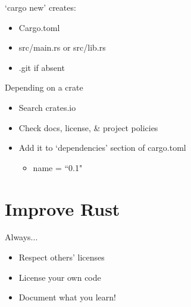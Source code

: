\documentclass[50pt]{beamer}
\begin{document}
\begin{frame}
    `cargo new' creates:
    \begin{itemize}
        \item Cargo.toml
        \item src/main.rs or src/lib.rs
        \item .git if absent
    \end{itemize}
\end{frame}

\begin{frame}[fragile]
    Depending on a crate
    \begin{itemize}
        \item Search crates.io
        \item Check docs, license, \& project policies
        \item Add it to `dependencies' section of cargo.toml
        \begin{itemize}

\item name = ``0.1"

        \end{itemize}
    \end{itemize}
\end{frame}


\section{Improve Rust}

\begin{frame}
    Always...
    \begin{itemize}
        \item Respect others' licenses
        \item License your own code
        \item Document what you learn!
    \end{itemize}
\end{frame}
\end{document}
